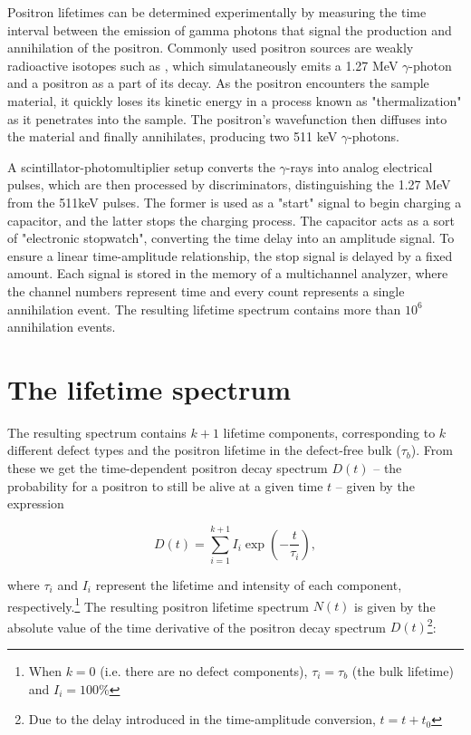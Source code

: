 Positron lifetimes can be determined experimentally by measuring the time interval between the emission of gamma photons that signal the production and annihilation of the positron. Commonly used positron sources are weakly radioactive isotopes such as , which simulataneously emits a 1.27 MeV $\gamma$-photon and a positron as a part of its \ch{$\beta$^{+}} decay. As the positron encounters the sample material, it quickly loses its kinetic energy in a process known as "thermalization" as it penetrates into the sample. The positron's wavefunction then diffuses into the material and finally annihilates, producing two 511 keV $\gamma$-photons.

A scintillator-photomultiplier setup converts the $\gamma$-rays into analog electrical pulses, which are then processed by discriminators, distinguishing the 1.27 MeV from the 511keV pulses. The former is used as a "start" signal to begin charging a capacitor, and the latter stops the charging process. The capacitor acts as a sort of "electronic stopwatch", converting the time delay into an amplitude signal. To ensure a linear time-amplitude relationship, the stop signal is delayed by a fixed amount. Each signal is stored in the memory of a multichannel analyzer, where the channel numbers represent time and every count represents a single annihilation event. The resulting lifetime spectrum contains more than $10^6$ annihilation events.

\section{The lifetime spectrum}

The resulting spectrum contains $k+1$ lifetime components, corresponding to $k$ different defect types and the positron lifetime in the defect-free bulk ($\tau_b$). From these we get the time-dependent positron decay spectrum $D(t)$ -- the probability for a positron to still be alive at a given time $t$ \cite{EFermi} -- given by the expression

\begin{equation}
    D(t) = \sum_{i=1}^{k+1}I_i\exp\left(-\frac{t}{\tau_i}\right),
\end{equation}

where $\tau_i$ and $I_i$ represent the lifetime and intensity of each component, respectively.\footnote{When $k=0$ (i.e. there are no defect components), $\tau_i = \tau_b$ (the bulk lifetime) and $I_i = 100\%$} The resulting positron lifetime spectrum $N(t)$ is given by the absolute value of the time derivative of the positron decay spectrum $D(t)$\footnote{Due to the delay introduced in the time-amplitude conversion, $t = t + t_0$}:

